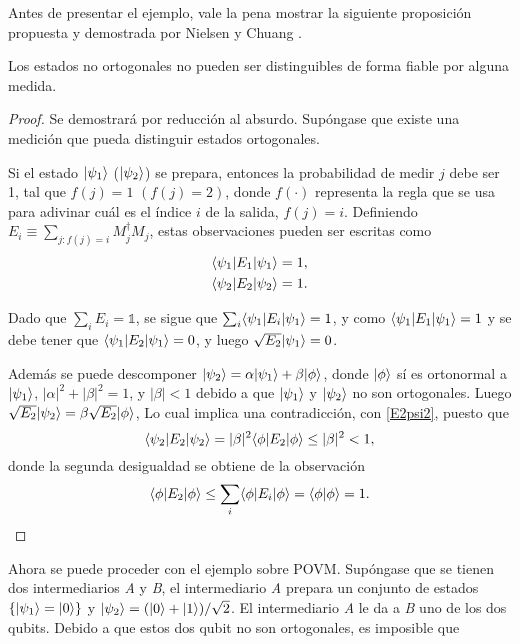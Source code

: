 Antes de presentar el ejemplo, vale la pena mostrar la siguiente proposición
propuesta y demostrada por Nielsen y Chuang {\cite{nielsen_chuang_2010}}.

\begin{proposition}
Los estados no ortogonales no pueden ser distinguibles de forma fiable por alguna medida.
\end{proposition}
\begin{proof}
Se demostrará por reducción al absurdo. Supóngase que existe una medición que
pueda distinguir estados ortogonales.

Si el estado $|\psi_1\rangle $ ($|\psi_2\rangle $) se prepara, entonces la
probabilidad de medir $j$ debe ser 1, tal que  $f(j) =1$ $(f(j)=2)$, donde $f(\cdot)$ representa
la regla que se usa para adivinar cuál es el índice $i$ de la salida, $f(j)=i$. 
Definiendo $E_i\equiv \sum_{j:f(j)=i}M_j^\dagger M_j$, estas observaciones pueden ser escritas como 
\begin{align}
	\langle \psi_1|E_1|\psi_1\rangle=1, \label{E1psi1} \\
	\langle \psi_2|E_2|\psi_2\rangle=1\label{E2psi2}.
\end{align}

Dado que $\sum_i E_i=\mathds{1}$, se sigue que $\sum_i \langle \psi_1|E_i|\psi_1\rangle=1$,
y como $\langle \psi_1|E_1|\psi_1\rangle=1$ y se debe tener que $\langle \psi_1|E_2|\psi_1\rangle=0$,
y luego $\sqrt{E_2}|\psi_1\rangle=0$. 


Además se puede descomponer  
$|\psi_2\rangle=\alpha|\psi_1\rangle +\beta|\phi\rangle$, donde $|\phi\rangle$ sí es ortonormal
a $|\psi_1\rangle $, $|\alpha|^2+|\beta|^2=1$, y $|\beta|<1$ debido a que $|\psi_1\rangle$
y $|\psi_2\rangle$ no son ortogonales. Luego $\sqrt{E_2}|\psi_2\rangle=\beta \sqrt{E_2}|\phi\rangle$, Lo
cual implica una contradicción, con {\ref{E2psi2}}, puesto que \begin{equation}
	\langle \psi_2|E_2|\psi_2\rangle=|\beta|^2 \langle\phi|E_2|\phi\rangle \le |\beta|^2<1,
\end{equation} 
donde la segunda desigualdad  se obtiene de la observación \[ \langle
\phi|E_2|\phi\rangle \le \sum_i\langle \phi|E_i|\phi\rangle= \langle\phi|\phi\rangle=1. \]
\end{proof}
Ahora se puede proceder con el ejemplo sobre POVM\@. Supóngase que se tienen
dos intermediarios \textit{A} y \textit{B}, el intermediario \textit{A} prepara
un conjunto de estados $\{|\psi_1\rangle=|0\rangle\}$ y $|\psi_2\rangle=(|0\rangle
+|1\rangle)/\sqrt{2}$. El intermediario \textit{A} le da a \textit{B} uno de los
dos qubits. Debido a que estos dos qubit no son ortogonales, es imposible que
